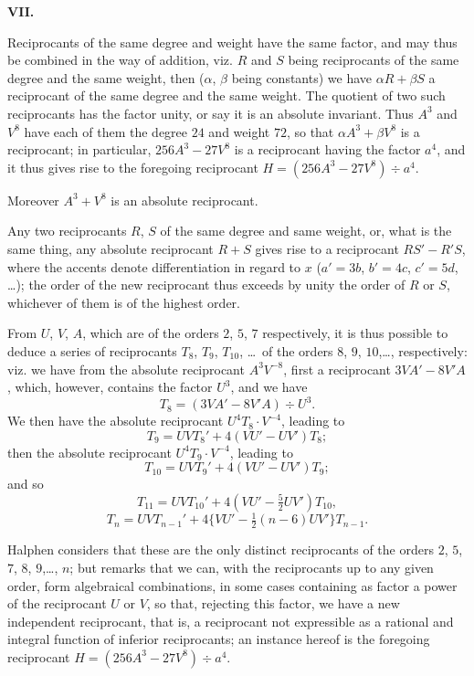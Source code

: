 \documentclass[11pt,a4paper]{book}
\begin{document}
{{{\medskip

\noindent\textbf{VII.}

Reciprocants of the same degree and weight have the same factor, and may thus be combined in the way of addition, viz.
$R$ and $S$ being reciprocants of the same degree and the same weight, then ($\alpha$, $\beta$ being constants) we have $\alpha R + \beta S$ a reciprocant of the same degree and the same weight.
The quotient of two such reciprocants has the factor unity, or say it is an absolute invariant.
Thus $A^3$ and $V^8$ have each of them the degree $24$ and weight $72$, so that $\alpha A^3 + \beta V^8$ is a reciprocant; in particular, $256A^3 - 27V^8$ is a reciprocant having the factor $a^4$, and it thus gives rise to the foregoing reciprocant $H = (256A^3 - 27V^8) \div a^4$.

Moreover $A^3 + V^8$ is an absolute reciprocant.

Any two reciprocants $R$, $S$ of the same degree and same weight, or, what is the same thing, any absolute reciprocant $R + S$ gives rise to a reciprocant $RS' - R'S$, where the accents denote differentiation in regard to $x$ ($a' = 3b$, $b' = 4c$, $c' = 5d$, \dots); the order of the new reciprocant thus exceeds by unity the order of $R$ or $S$, whichever of them is of the highest order.

From $U$, $V$, $A$, which are of the orders $2$, $5$, $7$ respectively, it is thus possible to deduce a series of reciprocants $T_8$, $T_9$, $T_{10}$, \dots\ of the orders $8$, $9$, $10$,\dots, respectively: viz.
we have from the absolute reciprocant $A^3V^{-8}$, first a reciprocant $3VA' - 8V'A$, which, however, contains the factor $U^3$, and we have
\[
T_8 = (3VA' - 8V'A) \div U^3.
\]
We then have the absolute reciprocant $U^4T_8 \cdot V^{-4}$, leading to
\[
T_9 = UVT_8' + 4(VU' - UV')T_8;
\]
then the absolute reciprocant $U^4T_9 \cdot V^{-4}$, leading to
\[
T_{10} = UVT_9' + 4(VU' - UV')T_9;
\]
and so
\[
T_{11} = UVT_{10}' + 4(VU' - \tfrac{5}{2}UV')T_{10},
\]
\[
T_n = UVT_{n-1}' + 4\{VU' - \tfrac{1}{2}(n-6)UV'\}T_{n-1}.
\]

Halphen considers that these are the only distinct reciprocants of the orders $2$, $5$, $7$, $8$, $9$,\dots, $n$; but remarks that we can, with the reciprocants up to any given order, form algebraical combinations, in some cases containing as factor a power of the reciprocant $U$ or $V$, so that, rejecting this factor, we have a new independent reciprocant, that is, a reciprocant not expressible as a rational and integral function of inferior reciprocants; an instance hereof is the foregoing reciprocant $H = (256A^3 - 27V^8) \div a^4$.

}}}
\end{document}
